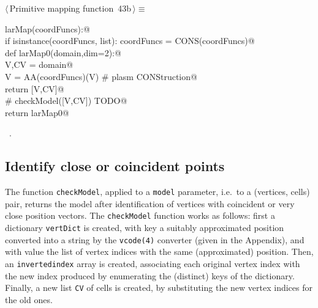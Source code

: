 \documentclass[11pt,oneside]{article}    %
\begin{document}
\begin{flushleft} \small \label{scrap71}
\protect{}$\langle\,$Primitive mapping function\nobreak\ {\footnotesize 43b}$\,\rangle\equiv$
\vspace{-1ex}
\begin{list}{}{} \item
\mbox{}\verb@def larMap(coordFuncs):@\\
\mbox{}\verb@    if isinstance(coordFuncs, list): coordFuncs = CONS(coordFuncs)@\\
\mbox{}\verb@    def larMap0(domain,dim=2):@\\
\mbox{}\verb@        V,CV = domain@\\
\mbox{}\verb@        V = AA(coordFuncs)(V)  # plasm CONStruction@\\
\mbox{}\verb@        return [V,CV]@\\
\mbox{}\verb@        # checkModel([V,CV])  TODO@\\
\mbox{}\verb@    return larMap0@\\
\mbox{}\verb@@{\NWsep}
\end{list}
\vspace{-1ex}
\footnotesize\addtolength{\baselineskip}{-1ex}
\begin{list}{}{\setlength{\itemsep}{-\parsep}\setlength{\itemindent}{-\leftmargin}}
\item \NWtxtMacroRefIn\ .
\end{list}
\end{flushleft}

\subsection{Identify close or coincident points}

The function \texttt{checkModel}, applied to a \texttt{model} parameter, i.e.~to a (vertices, cells)  pair, returns the model after identification of vertices with coincident or very close position vectors.
The \texttt{checkModel} function works as follows: first a dictionary \texttt{vertDict} is created, with key a suitably approximated position converted into a string by the \texttt{vcode(4)} converter (given in the Appendix), and with value the list of vertex indices with the same (approximated) position. Then, an \texttt{invertedindex} array is created, associating each original vertex index with the new index produced by enumerating the (distinct) keys of the dictionary. Finally, a new list \texttt{CV} of cells is created, by substituting the new vertex indices for the old ones. 
\end{document}
